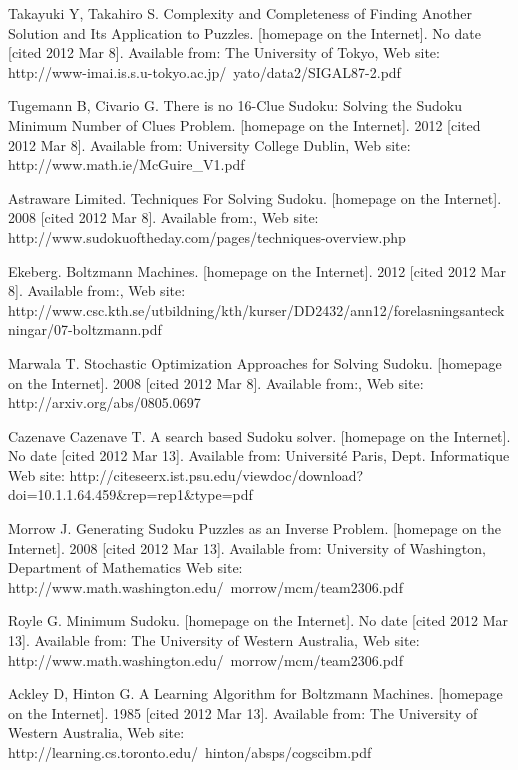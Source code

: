 \documentclass[a4paper,11pt]{kth-mag}
\begin{document}
\begin{thebibliography}{99}

Takayuki Y, Takahiro S. Complexity and Completeness of Finding Another Solution and Its Application to Puzzles. [homepage on the Internet]. No date [cited 2012 Mar 8]. Available from: The University of Tokyo, Web site: http://www-imai.is.s.u-tokyo.ac.jp/~yato/data2/SIGAL87-2.pdf

Tugemann B, Civario G. There is no 16-Clue Sudoku: Solving the Sudoku Minimum Number of Clues Problem. [homepage on the Internet]. 2012 [cited 2012 Mar 8]. Available from: University College Dublin, Web site: http://www.math.ie/McGuire\_V1.pdf

Astraware Limited. Techniques For Solving Sudoku. [homepage on the Internet]. 2008 [cited 2012 Mar 8]. Available from:, Web site: http://www.sudokuoftheday.com/pages/techniques-overview.php

Ekeberg. Boltzmann Machines. [homepage on the Internet]. 2012 [cited 2012 Mar 8]. Available from:, Web site: http://www.csc.kth.se/utbildning/kth/kurser/DD2432/ann12/forelasningsanteckningar/07-boltzmann.pdf

Marwala T. Stochastic Optimization Approaches for Solving Sudoku. [homepage on the Internet]. 2008 [cited 2012 Mar 8]. Available from:, Web site: http://arxiv.org/abs/0805.0697

Cazenave Cazenave T. A search based Sudoku solver. [homepage on the Internet]. No date [cited 2012 Mar 13]. Available from: Université Paris, Dept. Informatique Web site: http://citeseerx.ist.psu.edu/viewdoc/download?doi=10.1.1.64.459\&rep=rep1\&type=pdf

Morrow J. Generating Sudoku Puzzles as an Inverse Problem. [homepage on the Internet]. 2008 [cited 2012 Mar 13]. Available from: University of Washington, Department of Mathematics Web site: http://www.math.washington.edu/~morrow/mcm/team2306.pdf

Royle G. Minimum Sudoku. [homepage on the Internet]. No date [cited 2012 Mar 13]. Available from: The University of Western Australia, Web site: http://www.math.washington.edu/~morrow/mcm/team2306.pdf

Ackley D, Hinton G. A Learning Algorithm for Boltzmann Machines. [homepage on the Internet]. 1985 [cited 2012 Mar 13]. Available from: The University of Western Australia, Web site: http://learning.cs.toronto.edu/~hinton/absps/cogscibm.pdf


\end{thebibliography}
\end{document}
